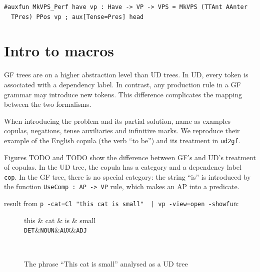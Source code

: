 \begin{verbatim}
#auxfun MkVPS_Perf have vp : Have -> VP -> VPS = MkVPS (TTAnt AAnter 
  TPres) PPos vp ; aux[Tense=Pres] head
\end{verbatim}

\section{Intro to macros}


GF trees are on a higher abstraction level than UD trees. In UD, every token is associated with a dependency label. In contrast, any production rule in a GF grammar may introduce new tokens. This difference complicates the mapping between the two formalisms.

When introducing the problem and its partial solution, \cite{kolachina-ranta-2017} name as examples copulas, negations, tense auxiliaries and infinitive marks. We reproduce their example of the English copula (the verb “to be”) and its treatment in \verb|ud2gf|.

Figures TODO and TODO show the difference between GF’s and UD’s treatment of copulas. In the UD tree, the copula has a category and a dependency label \verb|cop|. In the GF tree, there is no special category: the string “is” is introduced by the function \verb|UseComp : AP -> VP| rule, which makes an AP into a predicate.


result from \verb+p -cat=Cl "this cat is small"  | vp -view=open -showfun+:


\begin{figure}
    \centering
    \begin{dependency}
       \begin{deptext}[column sep=0.4cm]
             this \& cat \& is \& small \\
           {\tt DET}\&{\tt NOUN}\&{\tt AUX}\&{\tt ADJ}\\
       \end{deptext}
    \end{dependency} \\
    \caption{The phrase ``This cat is small'' analysed as a UD tree}
    \label{fig:enter-label}
\end{figure}

